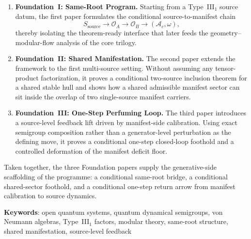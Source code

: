 \documentclass[12pt,a4paper,openany]{book}
\begin{document}
\begin{enumerate}
\item \textbf{Foundation~I: Same-Root Program.} Starting from a
Type~III$_1$ source datum, the first paper formulates the conditional
source-to-manifest chain
\[
S_{\mathrm{source}} \to \mathcal O_A \to \mathcal O_B \to (\mathcal A_c,\omega),
\]
thereby isolating the theorem-ready interface that later feeds the
geometry--modular-flow analysis of the core trilogy.

\item \textbf{Foundation~II: Shared Manifestation.} The second paper
extends the framework to the first multi-source setting. Without
assuming any tensor-product factorization, it proves a conditional
two-source inclusion theorem for a shared stable hull and shows how a
shared admissible manifest sector can sit inside the overlap of two
single-source manifest carriers.

\item \textbf{Foundation~III: One-Step Perfuming Loop.} The third paper
introduces a source-level feedback lift driven by manifest-side
calibration. Using exact semigroup composition rather than a
generator-level perturbation as the defining move, it proves a
conditional one-step closed-loop foothold and a controlled deformation
of the manifest deficit floor.
\end{enumerate}

Taken together, the three Foundation papers supply the generative-side
scaffolding of the programme: a conditional same-root bridge, a
conditional shared-sector foothold, and a conditional one-step return
arrow from manifest calibration to source dynamics.

\bigskip
\noindent\textbf{Keywords}: open quantum systems, quantum dynamical
semigroups, von Neumann algebras, Type~III$_1$ factors, modular theory,
same-root structure, shared manifestation, source-level feedback

\tableofcontents

\mainmatter






\end{document}
